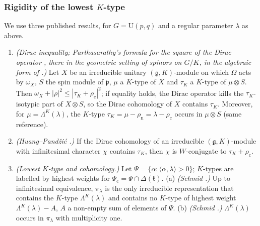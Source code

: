 \documentclass[10pt]{amsart}
\theoremstyle{definition}
\theoremstyle{remark}
\providecommand{\auU}{\mathrm U}
\begin{document}
\subsubsection{Rigidity of the lowest $K$-type}\label{par:ss-rigid}
We use three published results, for $G=\auU(p,q)$ and a regular parameter $\lambda$ as above.
\begin{enumerate}
\item[(D1)] \emph{(Dirac inequality; Parthasarathy's formula for the square of the Dirac operator \cite[Proposition~3.1]{Parthasarathy72}, there in the geometric setting of spinors on $G/K$, in the algebraic form of \cite[Proposition~1.1 and \S2]{HuangPandzic}.)} Let $X$ be an
irreducible unitary $(\mathfrak g,K)$-module on which $\Omega$ acts by $\omega_X$, $S$ the spin module
of $\mathfrak p$, $\mu$ a $K$-type of $X$ and $\tau_K$ a $K$-type of $\mu\otimes S$. Then
$\omega_X+|\rho|^2\le|\tau_K+\rho_{\mathrm c}|^2$; if equality holds, the Dirac operator kills the
$\tau_K$-isotypic part of $X\otimes S$, so the Dirac cohomology of $X$ contains $\tau_K$. Moreover, for
$\mu=\Lambda^K(\lambda)$, the $K$-type $\tau_K=\mu-\rho_{\mathrm n}=\lambda-\rho_{\mathrm c}$ occurs in
$\mu\otimes S$ (same reference).
\item[(D2)] \emph{(Huang--Pand\v zi\'c \cite[Theorem~2.3]{HuangPandzic}.)} If
the Dirac cohomology of an irreducible $(\mathfrak g,K)$-module with infinitesimal character
$\chi$ contains $\tau_K$, then $\chi$ is $W$-conjugate to $\tau_K+\rho_{\mathrm c}$.
\item[(D3)] \emph{(Lowest $K$-type and cohomology.)} Let $\Psi=\{\alpha:\langle\alpha,\lambda\rangle>0\}$; $K$-types are labelled by highest weights for $\Psi_{\mathrm c}=\Psi\cap\Delta(\mathfrak k)$.
(a) \emph{(Schmid \cite[Theorem~(1.3)]{Schmid75}.)} Up to infinitesimal equivalence, $\pi_\lambda$ is the only irreducible representation that contains the $K$-type $\Lambda^K(\lambda)$ and contains no $K$-type of highest weight $\Lambda^K(\lambda)-A$, $A$ a non-empty sum of elements of $\Psi$.
(b) \emph{(Schmid \cite[Corollary~(3.9), Corollary~(4.19) and the proof of Theorem~(1.3) on p.~560]{Schmid75}.)} $\Lambda^K(\lambda)$ occurs in $\pi_\lambda$ with multiplicity one.

\end{enumerate}
\end{document}
